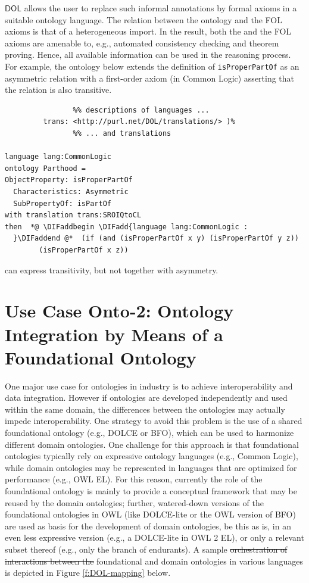 \documentclass[10pt,fleqn,final]{scrreprt}
\newcommand*{\DOL}{\ensuremath{\mathsf{DOL}}\xspace}
\providecommand{\DIFadd}[1]{{\protect\color{blue}\uwave{#1}}} %
\providecommand{\DIFdel}[1]{{\protect\color{red}\sout{#1}}}                      %
\providecommand{\DIFaddbegin}{} %
\providecommand{\DIFaddend}{} %
\providecommand{\DIFdelbegin}{} %
\providecommand{\DIFdelend}{} %
\begin{document}
\DOL allows the user to replace such informal annotations by formal axioms in a suitable ontology 
language. The relation between the \OWL ontology and the FOL axioms is that of a heterogeneous 
import. In the result, both the \OWL and the FOL axioms are amenable to, e.g., automated consistency 
checking and theorem proving. Hence, all available information can be used in the reasoning process.
For example, the ontology below extends the \OWL definition of \texttt{isProperPartOf} as an asymmetric relation
with a first-order axiom (in Common Logic) asserting that the relation is also transitive.
\begin{lstlisting}[basicstyle=\small\ttfamily,language=dolText,alsolanguage=clif,alsolanguage=owl2Manchester,escapechar=@,mathescape]
	 %prefix( lang:  <http://purl.net/DOL/languages/>
                %% descriptions of languages ...
         trans: <http://purl.net/DOL/translations/> )%
                %% ... and translations

language lang:CommonLogic
ontology Parthood =
ObjectProperty: isProperPartOf  
  Characteristics: Asymmetric  
  SubPropertyOf: isPartOf 
with translation trans:SROIQtoCL
then  *@ \DIFaddbegin \DIFadd{language lang:CommonLogic :
  }\DIFaddend @*  (if (and (isProperPartOf x y) (isProperPartOf y z)) 
        (isProperPartOf x z))
\end{lstlisting}
\OWL can express transitivity, but not together with asymmetry.

\section{Use Case Onto-2: Ontology Integration by Means of a Foundational Ontology}\DIFaddbegin \label{onto-2}
\DIFaddend One major use case for ontologies in industry is to achieve interoperability and data integration. 
However if ontologies are developed independently and used  within the same domain, the 
differences between the ontologies may actually impede interoperability. One strategy to avoid this 
problem is the use of a shared  foundational ontology (e.g., DOLCE or BFO), which can be used to 
harmonize different domain ontologies. One challenge for this approach is that foundational 
ontologies typically rely on expressive ontology languages (e.g., Common Logic), while domain 
ontologies may be represented in languages that are optimized for performance (e.g., OWL EL). For 
this reason, currently the role of the foundational ontology is mainly to provide a conceptual 
framework that may be reused by the  domain ontologies; further, watered-down versions of the 
foundational ontologies in OWL (like DOLCE-lite or the OWL version of BFO) are used as basis for 
the  development of domain ontologies, be this as is, in an even less expressive version (e.g., a 
DOLCE-lite in OWL 2 EL), or only a relevant subset thereof (e.g., only the branch of endurants). A 
sample \DIFdelbegin \DIFdel{orchestration of interactions between  the }\DIFdelend \DIFaddbegin \DIFadd{interplay between  }\DIFaddend foundational and domain ontologies in various 
languages is depicted in Figure \ref{f:DOL-mapping} below.
\end{document}
